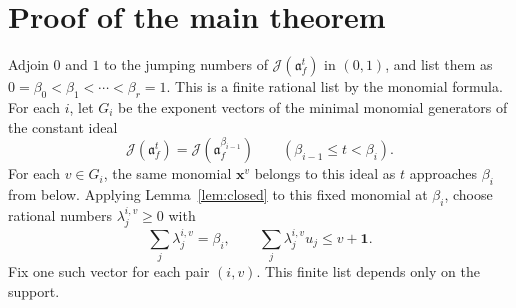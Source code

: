 \documentclass[11pt]{amsart}
\numberwithin{equation}{section}
\theoremstyle{definition}
\newcommand{\J}{\mathcal J}
\newcommand{\aideal}{\mathfrak a}
\newcommand{\xx}{\boldsymbol{x}}
\newcommand{\one}{\boldsymbol{1}}
\begin{document}
\section{Proof of the main theorem}

Adjoin $0$ and $1$ to the jumping numbers of $\J(\aideal_f^t)$ in $(0,1)$,
and list them as $0=\beta_0<\beta_1<\cdots<\beta_r=1$.
This is a finite rational list by the monomial formula.
For each $i$, let $G_i$ be the exponent vectors of the minimal monomial
generators of the constant ideal
\[
 \J(\aideal_f^t)=\J(\aideal_f^{\beta_{i-1}})
                  \qquad(\beta_{i-1}\le t<\beta_i).
\]
For each $v\in G_i$, the same monomial $\xx^v$ belongs to this ideal
as $t$ approaches $\beta_i$ from below. Applying Lemma~\ref{lem:closed}
to this fixed monomial at $\beta_i$, choose rational numbers
$\lambda_j^{i,v}\ge0$ with
\begin{equation}\label{eq:finite-witnesses}
 \sum_j\lambda_j^{i,v}=\beta_i,\qquad
 \sum_j\lambda_j^{i,v}u_j\le v+\one.
\end{equation}
Fix one such vector for each pair $(i,v)$. This finite list depends only on the support.
\end{document}
